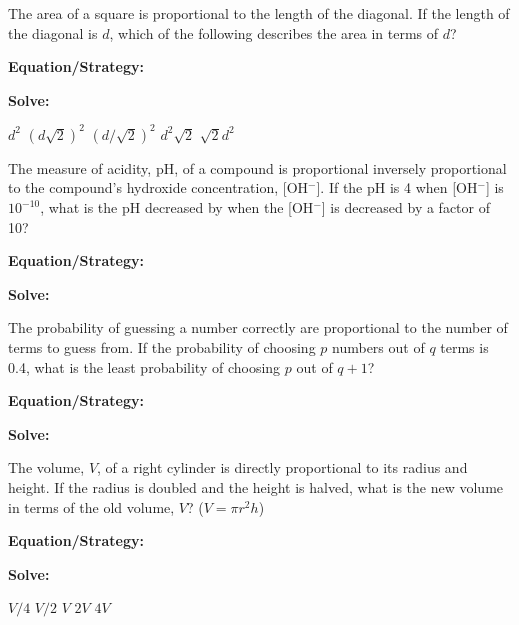 \vfill
\newpage
\begin{multicols*}{2}
\begin{outline}[enumerate]
\medium

\1 The area of a square is proportional to the length of the diagonal. If the length of the diagonal is $d$, which of the following describes the area in terms of $d$?

\bigskip
\textbf{Equation/Strategy:} \hrulefill

\bigskip
\textbf{Solve:}

\vfill
\2 $d^2$
\2 $(d\sqrt2)^2$
\2 $(d/\sqrt2)^2$
\2 $d^2\sqrt2$
\2 $\sqrt2d^2$

\midline

\1 The measure of acidity, pH, of a compound is proportional inversely proportional to the compound's hydroxide concentration, [OH$^-$]. If the pH is 4 when [OH$^-$] is $10^{-10}$, what is the pH decreased by when the [OH$^-$] is decreased by a factor of 10?

\bigskip
\textbf{Equation/Strategy:} \hrulefill

\bigskip
\textbf{Solve:}

\vfill
{}

\columnbreak
\advanced

\1 The probability of guessing a number correctly are proportional to the number of terms to guess from. If the probability of choosing $p$ numbers out of $q$ terms is 0.4, what is the least probability of choosing $p$ out of $q+1$?

\bigskip
\textbf{Equation/Strategy:} \hrulefill

\bigskip
\textbf{Solve:}

\vfill
{}

\midline

\1 The volume, $V$, of a right cylinder is directly proportional to its radius and height. If the radius is doubled and the height is halved, what is the new volume in terms of the old volume, $V$? ($V=\pi r^2h$)

\bigskip
\textbf{Equation/Strategy:} \hrulefill

\bigskip
\textbf{Solve:}

\vfill
\2 $V/4$
\2 $V/2$
\2 $V$
\2 $2V$
\2 $4V$
\end{outline}
\end{multicols*}